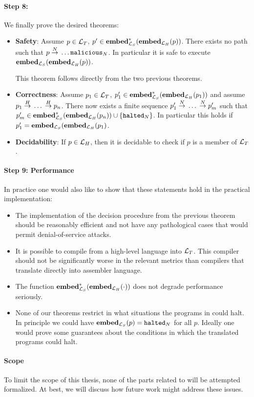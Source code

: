 \paragraph{Step 8:} We finally prove the desired theorems:
\begin{itemize}
\item \textbf{Safety}: Assume $p \in \mathcal{L}_T$,
  $p' \in \mathbf{embed}^\ast_{\mathcal{L}_S}({\mathbf{embed}}_{\mathcal{L}_H}(p))$. There exists no path such that
  $p {{}\stackrel{N}{->}{}} \dots {\ensuremath{{\mathtt{malicious}}_N}}$. In particular it is safe to
  execute ${\mathbf{embed}}_{\mathcal{L}_S}({\mathbf{embed}}_{\mathcal{L}_H}(p))$.

  This theorem follows directly from the two previous theorems.

\item \textbf{Correctness}: Assume $p_1 \in \mathcal{L}_T$,
  $p_1' \in \mathbf{embed}^\ast_{\mathcal{L}_S}({\mathbf{embed}}_{\mathcal{L}_H}(p_1))$ and assume
  $p_1 {{}\stackrel{H}{->}{}} \dots {{}\ensuremath{\stackrel{H}{->}}{}} p_n$. There now exists a finite sequence
  $p_1' {{}\stackrel{N}{->}{}} \dots {{}\ensuremath{\stackrel{N}{->}}{}} p_m'$ such that
  $p_m' \in \mathbf{embed}^\ast_{\mathcal{L}_S}({\mathbf{embed}}_{\mathcal{L}_H}(p_n)) \cup \{{\mathtt{halted}_N}\}$. In
  particular this holds if $p_1' = {\mathbf{embed}}_{\mathcal{L}_S}({\mathbf{embed}}_{\mathcal{L}_H}(p_1)$.

\item \textbf{Decidability}: If $p \in \mathcal{L}_H$, then it is decidable to check
  if $p$ is a member of $\mathcal{L}_T$.
\end{itemize}

\paragraph{Step 9: Performance} In practice one would also like to show that
these statements hold in the practical implementation:

\begin{itemize}
\item The implementation of the decision procedure from the previous theorem
  should be reasonably efficient and not have any pathological cases that would
  permit denial-of-service attacks.
\item It is possible to compile from a high-level language into
  $\mathcal{L}_T$. This compiler should not be significantly worse in the relevant
  metrics than compilers that translate directly into assembler language.
\item The function $\mathbf{embed}^\ast_{\mathcal{L}_S}({\mathbf{embed}}_{\mathcal{L}_H}(\cdot))$ does not degrade
  performance seriously.
\item None of our theorems restrict in what situations the programs in
  \nativelang could halt. In principle we could have
  ${\mathbf{embed}}_{\mathcal{L}_S}(p) = {\mathtt{halted}_N}$ for all $p$. Ideally one would prove some
  guarantees about the conditions in which the translated programs could halt.
\end{itemize}

\paragraph{Scope} To limit the scope of this thesis, none of the
parts related to \nativelang will be attempted formalized. At best, we will
discuss how future work might address these issues.
